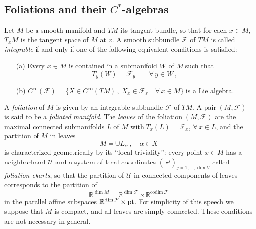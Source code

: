 \documentclass{beamer}
\theoremstyle{plain}
\newcommand{\sF}{\mathcal{F}}       %
\begin{document}
\begin{frame}
	\section{Foliations and their $C^*$-algebras}
\begin{definition}
	
	Let $M$ be a smooth manifold and $TM$ its tangent bundle, so that
	for each $x \in M$, $T_x M$ is the tangent space of $M$ at $x$. A
	smooth subbundle $\mathcal{F}$ of $TM$ is called {\it integrable} if and only if one of
	the following equivalent conditions is satisfied:
	
	\smallskip
	
	\begin{enumerate}
		
		\item[(a)] Every $x \in M$ is contained in a submanifold $W$ of $M$ such that
		$$
		T_y (W) = \mathcal{F}_y \qquad \forall \, y \in W \, ,
		$$
		
		\smallskip
		
		\item[(b)] $C^{\infty} \left( \mathcal{F}\right)  = \{ X \in C^{\infty} \left(TM\right) \, , \ X_x \in
		\mathcal{F}_x \quad \forall \, x \in M \}$ is a Lie algebra.
		
		\smallskip

	\end{enumerate}

\end{definition}


\end{frame}
\begin{frame}
A \textit{foliation} of $M$ is given by an integrable subbundle $\mathcal{F}$ of $TM$.  	A pair $\left(M, \sF\right)$ is said to be a \textit{foliated manifold}.
The \textit{leaves} of the foliation $\left(M , \mathcal F\right)$ are the maximal connected
submanifolds $L$ of $M$ with $T_x (L) = \mathcal{F}_x $, $\forall \, x \in L$,
and the partition of $M$ in leaves $$M = \cup
L_{\alpha}\,,\quad\alpha \in X$$ is characterized geometrically by
its ``local triviality'': every point $x \in M$ has a neighborhood
$\mathcal U$ and a system of local coordinates
$(x^j)_{j = 1 , \ldots , \dim V}$ called
{\it foliation charts}, so
that the partition of $\mathcal U$ in connected components of
leaves corresponds to the partition of 
\begin{equation*}
	{\mathbb
		R}^{\dim M} = {\mathbb R}^{\dim \mathcal F} \times {\mathbb R}^{\text{codim}
		\, \mathcal F}
\end{equation*}
in the parallel affine subspaces 
$
{\mathbb R}^{\dim \mathcal F}
\times {\rm pt}$.
For simplicity of this speech we suppose that $M$ is compact, and all leaves are simply connected. These conditions are not necessary in general.
\end{frame}
\end{document}
